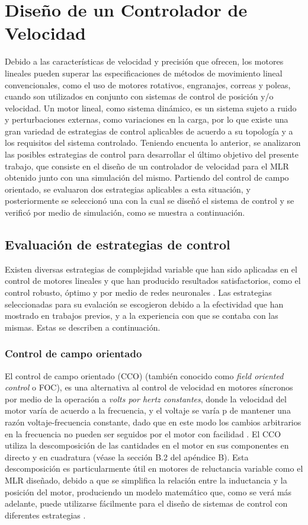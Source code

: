 \chapter{Diseño de un Controlador de Velocidad}

Debido a las características de velocidad y precisión que ofrecen, los motores lineales pueden superar las especificaciones de métodos de movimiento lineal convencionales, como el uso de motores rotativos, engranajes, correas y poleas, cuando son utilizados en conjunto con sistemas de control de posición y/o velocidad. Un motor lineal, como sistema dinámico, es un sistema sujeto a ruido y perturbaciones
externas, como variaciones en la carga, por lo que existe una gran variedad de estrategias de control aplicables de acuerdo a su topología y a los requisitos del sistema controlado. Teniendo encuenta lo anterior, se analizaron las posibles estrategias de control para desarrollar el último objetivo del presente trabajo, que consiste en el diseño de un controlador de velocidad para el MLR obtenido junto con una simulación del mismo. Partiendo del control de campo orientado, se evaluaron dos estrategias aplicables a esta situación, y posteriormente se seleccionó una con la cual se diseñó el sistema de control y se verificó por medio de simulación, como se muestra a continuación.


\section{Evaluación de estrategias de control}
Existen diversas estrategias de complejidad variable que han sido aplicadas en el control de motores lineales y que han producido resultados satisfactorios, como el control robusto, óptimo y por medio de redes neuronales \cite{chen2007,liu2007,lopez2013}. Las estrategias seleccionadas para su evalación se escogieron debido a la efectividad que han mostrado en trabajos previos, y a la experiencia con que se contaba con las mismas. Estas se describen a continuación.

\subsection{Control de campo orientado}
El control de campo orientado (CCO) (también conocido como \textit{field oriented control} o FOC), es una alternativa al control de velocidad en motores síncronos por medio de la operación a \textit{volts por hertz constantes}, donde la velocidad del motor varía de acuerdo a la frecuencia, y el voltaje se varía p de mantener una razón voltaje-frecuencia constante, dado que en este modo  los cambios arbitrarios en la frecuencia no pueden ser seguidos por el motor con facilidad \cite{fitzgerald2003}. El CCO utiliza la descomposición de las cantidades en el motor en sus componentes en directo y en cuadratura (véase la sección B.2 del apéndice B). Esta descomposición es particularmente útil en motores de reluctancia variable como el MLR diseñado, debido a que se simplifica la relación entre la inductancia y la posición del motor, produciendo un modelo matemático que, como se verá más adelante, puede utilizarse fácilmente para el diseño de sistemas de control con diferentes estrategias \cite{boldea2013}.

